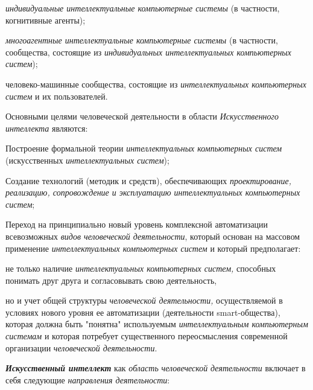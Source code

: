 \begin{textitemize}
	\item
	\textit{индивидуальные интеллектуальные компьютерные системы} (в частности, когнитивные агенты);
	\item
	\textit{многоагентные интеллектуальные компьютерные системы} (в частности, сообщества, состоящие из \textit{индивидуальных интеллектуальных компьютерных систем});
	\item
	человеко-машинные сообщества, состоящие из \textit{интеллектуальных компьютерных систем} и их пользователей.
\end{textitemize}

Основными целями человеческой деятельности в области \textit{Искусственного интеллекта} являются:

\begin{textitemize}
	\item
	Построение формальной теории \textit{интеллектуальных компьютерных систем} (искусственных \textit{интеллектуальных систем});
	\item
	Создание технологий (методик и средств), обеспечивающих \textit{проектирование, реализацию, сопровождение и эксплуатацию интеллектуальных компьютерных систем};
	\item
	Переход на принципиально новый уровень комплексной автоматизации всевозможных \textit{видов человеческой деятельности}, который основан на массовом применение \textit{интеллектуальных компьютерных систем} и который предполагает:
	\begin{textitemize}
		\item
		не только наличие \textit{интеллектуальных компьютерных систем,} способных понимать друг друга и согласовывать свою деятельность,
		\item
		но и учет общей структуры \textit{человеческой деятельности,} осуществляемой в условиях нового уровня ее автоматизации (деятельности smart-общества), которая должна быть "понятна" используемым \textit{интеллектуальным компьютерным системам} и которая потребует существенного переосмысления современной организации \textit{человеческой деятельности}.
	\end{textitemize}
\end{textitemize}

\textbf{\textit{Искусственный интеллект}} как \textit{область} \textit{человеческой} \textit{деятельности} включает в себя следующие \textit{направления деятельности}:

